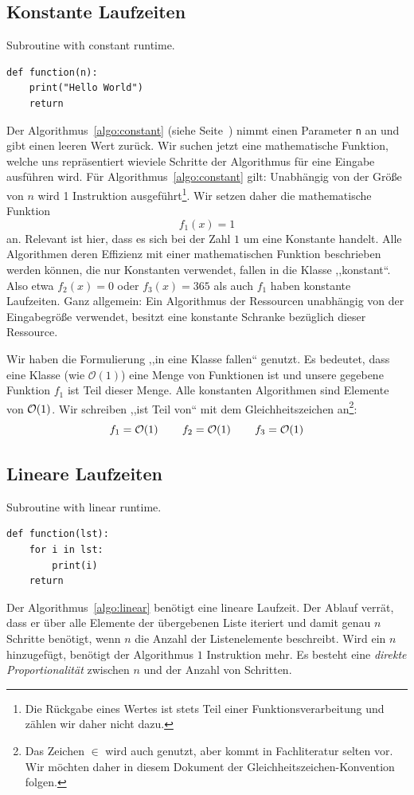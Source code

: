 \subsection{Konstante Laufzeiten}
%
\begin{algorithm}[p]
\caption{Subroutine with constant runtime.}
\label{algo:constant}
\begin{lstlisting}
def function(n):
    print("Hello World")
    return
\end{lstlisting}
\end{algorithm}
%
Der Algorithmus~\ref{algo:constant} (siehe Seite~\pageref{algo:constant}) nimmt einen Parameter \texttt{n} an und gibt einen leeren Wert zurück. Wir suchen jetzt eine mathematische Funktion, welche uns repräsentiert wieviele Schritte der Algorithmus für eine Eingabe ausführen wird. Für Algorithmus~\ref{algo:constant} gilt: Unabhängig von der Größe von $n$ wird 1 Instruktion ausgeführt\footnote{Die Rückgabe eines Wertes ist stets Teil einer Funktionsverarbeitung und zählen wir daher nicht dazu.}. Wir setzen daher die mathematische Funktion
\[
  f_1(x) = 1
\]
an. Relevant ist hier, dass es sich bei der Zahl $1$ um eine Konstante handelt. Alle Algorithmen deren Effizienz mit einer mathematischen Funktion beschrieben werden können, die nur Konstanten verwendet, fallen in die Klasse ,,konstant``. Also etwa $f_2(x) = 0$ oder $f_3(x) = 365$ als auch $f_1$ haben konstante Laufzeiten. Ganz allgemein: Ein Algorithmus der Ressourcen unabhängig von der Eingabegröße verwendet, besitzt eine konstante Schranke bezüglich dieser Ressource.

Wir haben die Formulierung ,,in eine Klasse fallen`` genutzt. Es bedeutet, dass eine Klasse (wie $\mathcal{O}(1)$) eine Menge von Funktionen ist und unsere gegebene Funktion $f_1$ ist Teil dieser Menge. Alle konstanten Algorithmen sind Elemente von $\mathcal{O}\!\left(1\right)$. Wir schreiben ,,ist Teil von`` mit dem Gleichheitszeichen an\footnote{Das Zeichen $\in$ wird auch genutzt, aber kommt in Fachliteratur selten vor. Wir möchten daher in diesem Dokument der Gleichheitszeichen-Konvention folgen.}:
\[
    f_1 = \mathcal{O}\!\left(1\right) \qquad f_2 = \mathcal{O}\!\left(1\right) \qquad f_3 = \mathcal{O}\!\left(1\right)
\]
%
\subsection{Lineare Laufzeiten}
%
\begin{algorithm}[p]
\caption{Subroutine with linear runtime.}
\label{algo:linear}
\begin{lstlisting}
def function(lst):
    for i in lst:
        print(i)
    return
\end{lstlisting}
\end{algorithm}
%
Der Algorithmus~\ref{algo:linear} benötigt eine lineare Laufzeit. Der Ablauf verrät, dass er über alle Elemente der übergebenen Liste iteriert und damit genau $n$ Schritte benötigt, wenn $n$ die Anzahl der Listenelemente beschreibt. Wird ein $n$ hinzugefügt, benötigt der Algorithmus $1$ Instruktion mehr. Es besteht eine \emph{direkte Proportionalität} zwischen $n$ und der Anzahl von Schritten.

